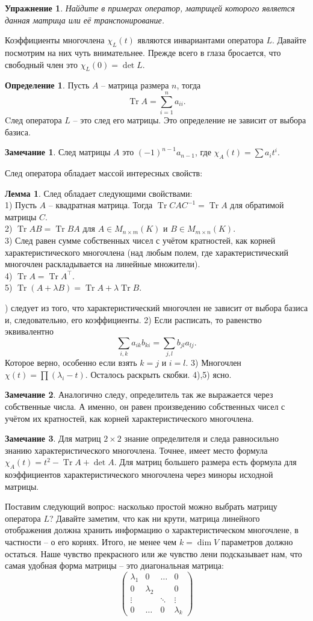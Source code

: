 \documentclass[10pt,a4paper,oneside]{book}
\newtheorem{uprz}{\color{violet!100!black} Упражнение}
\theoremstyle{definition}
\newtheorem*{rem}{\color{green!50!blue}Замечание}
\newtheorem*{defn}{\color{yellow!30!red} Определение}
\newtheorem{lem}{\color{green!50!black}Лемма}
\newcommand{\Tr}{\operatorname{Tr}}
\newcommand{\tr}{\operatorname{Tr}}
\def\dfn{\begin{defn}}
\def\edfn{\end{defn}}
\def\lm{\begin{lem}}
\def\elm{\end{lem}}
\def\rm{\begin{rem}}
\def\erm{\end{rem}}
\def\pmat{\begin{pmatrix}}
\def\epmat{\end{pmatrix}}
\def\upr{\begin{uprz}}
\def\eupr{\end{uprz}}
\begin{document}
\upr Найдите в примерах оператор, матрицей которого является данная матрица или её транспонирование.
\eupr



Коэффициенты многочлена $\chi_L(t)$ являются инвариантами оператора $L$. Давайте посмотрим на них чуть внимательнее.
Прежде всего в глаза бросается, что свободный член это $\chi_L(0)=\det L$.
 

\dfn Пусть $A$ -- матрица размера $n$, тогда $$\Tr A=\sum_{i=1}^n a_{ii}.$$ 
Cлед оператора $L$ -- это след его матрицы. Это определение не зависит от выбора базиса.
\edfn

\rm След матрицы $A$ это $(-1)^{n-1}a_{n-1}$, где $\chi_A(t)= \sum a_{i}t^i$. 
\erm

След оператора обладает массой интересных свойств:

\lm След обладает следующими свойствами: \\
1) Пусть $A$ -- квадратная матрица. Тогда $\tr CAC^{-1}= \tr A$ для обратимой матрицы $C$.\\
2) $\tr AB = \tr BA$ для $A\in M_{n\times m}(K)$ и $B\in M_{m\times n}(K)$.\\
3) След равен сумме собственных чисел с учётом кратностей, как корней характеристического многочлена (над любым полем, где характеристический многочлен раскладывается на линейные множители).\\
4) $\tr A= \tr A^{\top}$.\\
5) $\tr( A + \lambda B) = \tr A + \lambda \tr B$.
\elm
{}) следует из того, что характеристический многочлен не зависит от выбора базиса и, следовательно, его коэффициенты. 2) Если расписать, то равенство эквивалентно
$$\sum_{i,k} a_{ik}b_{ki}=\sum_{j,l} b_{jl}a_{lj}.$$
Которое верно, особенно если взять $k=j$ и $i=l$. 3) Многочлен $\chi(t)=\prod (\lambda_i-t)$. Осталось раскрыть скобки. 4),5) ясно. \endproof


\rm Аналогично следу, определитель так же выражается через собственные числа. А именно, он равен произведению собственных чисел с учётом их кратностей, как корней характеристического многочлена.
\erm


\rm Для матриц $2\times 2$ знание определителя и следа равносильно знанию характеристического многочлена. Точнее, имеет место формула $\chi_A(t)=t^2-\Tr A + \det A$. Для матриц большего размера есть формула для коэффициентов характеристического многочлена через миноры исходной матрицы.
\erm


Поставим следующий вопрос: насколько простой можно выбрать матрицу оператора $L$? Давайте заметим, что как ни крути, матрица линейного отображения должна хранить информацию о характеристическом многочлене, в частности -- о его корнях. Итого, не менее чем $k=\dim V$ параметров должно остаться. Наше чувство прекрасного или же чувство лени подсказывает нам, что самая удобная форма матрицы  -- это диагональная матрица:
$$\pmat \lambda_1 & 0 &\dots & 0\\
0 & \lambda_2 & &0 \\
\vdots && \ddots &\vdots \\
0 & \dots & 0 & \lambda_k \epmat$$
\end{document}
